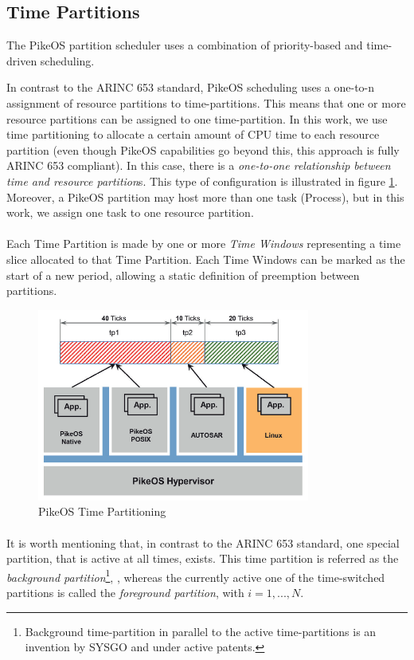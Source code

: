 \subsection{Time Partitions}
The PikeOS partition scheduler uses a combination of priority-based and time-driven scheduling. 
\par In contrast to the ARINC 653 standard, PikeOS scheduling uses a one-to-n assignment of resource partitions to time-partitions. This means that one or more resource partitions can be assigned to one time-partition. In this work, we use time partitioning to allocate a certain amount of CPU time to each resource partition (even though PikeOS capabilities go beyond this, this approach is fully ARINC 653 compliant). In this case, there is a \emph{one-to-one relationship between time and resource partition}s. This type of configuration is illustrated in figure \ref{fig:TimePartitioning}. Moreover, a PikeOS partition may host more than one task (Process), but in this work, we assign one task to one resource partition.
\paragraph{} Each Time Partition is made by one or more \emph{Time Windows} representing a time slice allocated to that Time Partition. Each Time Windows can be marked as the start of a new period, allowing a static definition of preemption between partitions.

\begin{figure}[htbp] 
\centering    
\includegraphics[width=0.8\textwidth]{TimePartitioning}
\caption{PikeOS Time Partitioning}
\label{fig:TimePartitioning}
\end{figure}

\paragraph{}It is worth mentioning that, in contrast to the ARINC 653 standard, one special partition, that is active at all times, exists. This time partition is referred as the \emph{background partition}\footnote{Background time-partition in parallel to the active
time-partitions is an invention by SYSGO and under active patents.}, , whereas the currently active one of the time-switched partitions is called the \emph{foreground partition},  with $i={1,...,N}$.


